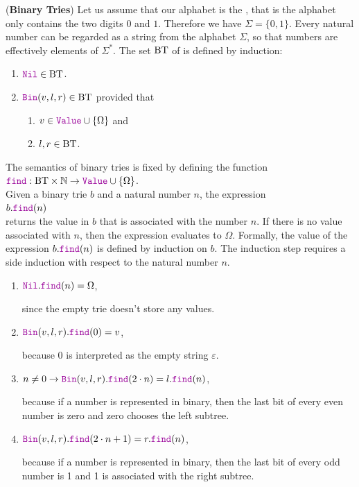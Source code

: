 \exercise
(\textbf{Binary Tries})  Let us assume that our alphabet is the , that is the alphabet
only contains the two digits $0$ and $1$.  Therefore we have $\Sigma = \{0,1\}$.  Every natural
number can be regarded as a string from the alphabet $\Sigma$, so that numbers are effectively
elements of $\Sigma^*$.  The set $\mathrm{BT}$ of  is defined by induction:
\begin{enumerate}
\item $\mytt{Nil} \in \BT$.
\item $\mytt{Bin}(v,l,r) \in \BT$ provided that
      \begin{enumerate}
      \item $v \in \mytt{Value} \cup \{\Omega\}$ \quad and
      \item $l,r \in \mathrm{BT}$.
      \end{enumerate}
\end{enumerate}
The semantics of binary tries is fixed by defining the function
\\[0.2cm]
\hspace*{1.3cm}
$\mytt{find}: \BT \times \mathbb{N} \rightarrow \mytt{Value} \cup \{ \Omega \}$.
\\[0.2cm]
Given a binary trie $b$ and a natural number $n$, the expression
\\[0.2cm]
\hspace*{1.3cm}
$b.\mytt{find}(n)$ 
\\[0.2cm]
returns the value in $b$ that is associated with the number $n$.  If there is no value associated
with $n$, then the expression evaluates to $\Omega$.  Formally, the value of the expression
 $b.\mytt{find}(n)$ is defined by induction on $b$.  The induction step requires a side induction
 with respect to the natural number $n$.
\begin{enumerate}
\item $\mytt{Nil}.\mytt{find}(n) = \Omega$,

      since the empty trie doesn't store any values.
\item $\mytt{Bin}(v,l,r).\mytt{find}(0) = v$,

      because $0$ is interpreted as the empty string $\varepsilon$.
\item $n \not= 0 \rightarrow \mytt{Bin}(v,l,r).\mytt{find}(2\cdot n) = l.\mytt{find}(n)$,

      because if a number is represented in binary, then the last bit of every even number is zero
      and zero chooses the left subtree.
\item $\mytt{Bin}(v,l,r).\mytt{find}(2 \cdot n + 1) = r.\mytt{find}(n)$,

      because if a number is represented in binary, then the last bit of every odd number is 1 and 
      1 is associated with the right subtree.
\end{enumerate}
